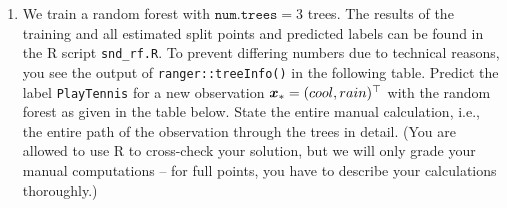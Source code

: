 \documentclass[a4paper]{article}
\newcounter{aufg}
\begin{document}

\begin{enumerate}
  \item We train a random forest with $\texttt{num.trees} = 3$ trees. 
  The results of the training and all estimated split points and predicted 
  labels can be found in the R script \texttt{snd\_rf.R}. 
  To prevent differing numbers due to technical reasons, you see the output of 
  \texttt{ranger::treeInfo()} in the following table. 
  Predict the label \texttt{PlayTennis} for a new observation 
  $\bm{x}_* = (cool, rain)^\top$ with the random forest as given in the table 
  below. State the entire manual calculation, i.e., the entire path of the 
  observation through the trees in detail. (You are allowed to use R to 
  cross-check your solution, but we will only grade your manual computations -- 
  for full points, you have to describe your calculations thoroughly.) 
\end{enumerate}
\end{document}
